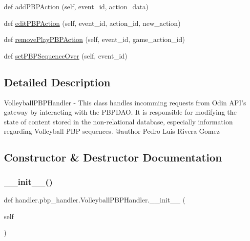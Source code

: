 \begin{DoxyCompactItemize}
def \hyperlink{classhandler_1_1pbp__handler_1_1_volleyball_p_b_p_handler_a10b7b1b4d77c4735a0d122cdc9ff9ced}{add\+P\+B\+P\+Action} (self, event\+\_\+id, action\+\_\+data)
\item 
def \hyperlink{classhandler_1_1pbp__handler_1_1_volleyball_p_b_p_handler_aa611d81a64cef940be80bf1a7e942925}{edit\+P\+B\+P\+Action} (self, event\+\_\+id, action\+\_\+id, new\+\_\+action)
\item 
def \hyperlink{classhandler_1_1pbp__handler_1_1_volleyball_p_b_p_handler_ad92125b0fb3dda3cbce9462027329ec3}{remove\+Play\+P\+B\+P\+Action} (self, event\+\_\+id, game\+\_\+action\+\_\+id)
\item 
def \hyperlink{classhandler_1_1pbp__handler_1_1_volleyball_p_b_p_handler_aadd6ddad362e098ade44269a18ba56fe}{set\+P\+B\+P\+Sequence\+Over} (self, event\+\_\+id)
\end{DoxyCompactItemize}


\subsection{Detailed Description}
\begin{DoxyVerb}VolleyballPBPHandler - This class handles incomming requests from Odin API's gateway
             by interacting with the PBPDAO. It is responsible for modifying
             the state of content stored in the non-relational database,
             especially information regarding Volleyball PBP sequences.
@author Pedro Luis Rivera Gomez
\end{DoxyVerb}
 

\subsection{Constructor \& Destructor Documentation}
\mbox{\label{classhandler_1_1pbp__handler_1_1_volleyball_p_b_p_handler_aaf8bf93acc9d40e5cc83d7e923032b17}} 
\subsubsection{\texorpdfstring{\+\_\+\+\_\+init\+\_\+\+\_\+()}{\_\_init\_\_()}}
{\footnotesize\ttfamily def handler.\+pbp\+\_\+handler.\+Volleyball\+P\+B\+P\+Handler.\+\_\+\+\_\+init\+\_\+\+\_\+ (\begin{DoxyParamCaption}\item[{}]{self }\end{DoxyParamCaption})}

